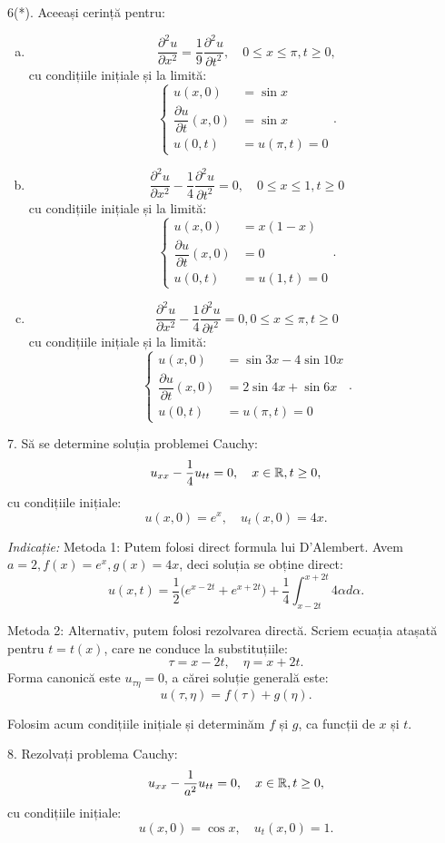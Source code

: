 6(*). Aceeași cerință pentru:
\begin{enumerate}[(a)]
\item
  \[
    \dfrac{\partial^2 u}{\partial x^2} = \dfrac{1}{9}\dfrac{\partial^2 u}{\partial t^2}, %
    \quad 0 \leq x \leq \pi, t \geq 0,
  \]
  cu condițiile inițiale și la limită:
  \[
    \begin{cases}
      u(x, 0) &= \sin x \\
      \dfrac{\partial u}{\partial t}(x, 0) &= \sin x \\
      u(0, t) &= u(\pi, t) = 0
    \end{cases}.
  \]
\item
  \[
    \dfrac{\partial^2 u}{\partial x^2} - \dfrac{1}{4} \dfrac{\partial^2 u}{\partial t^2} = 0, %
    \quad 0 \leq x \leq 1, t \geq 0
  \]
  cu condițiile inițiale și la limită:
  \[
    \begin{cases}
      u(x, 0) &= x(1 - x) \\
      \dfrac{\partial u}{\partial t}(x, 0) &= 0 \\
      u(0, t) &= u(1, t) = 0
    \end{cases}.
  \]
\item
  \[
    \dfrac{\partial^2 u}{\partial x^2} - \dfrac{1}{4} \dfrac{\partial^2 u}{\partial t^2} = 0, %
    0 \leq x \leq \pi, t \geq 0
  \]
  cu condițiile inițiale și la limită:
  \[
    \begin{cases}
      u(x, 0) &= \sin 3x - 4\sin 10x \\
      \dfrac{\partial u}{\partial t}(x, 0) &= 2 \sin 4x + \sin 6x \\
      u(0, t) &= u(\pi, t) = 0
    \end{cases}.
  \]
\end{enumerate}

\vspace{1cm}

7. Să se determine soluția problemei Cauchy:
\[
  u_{xx} - \dfrac{1}{4} u_{tt} = 0, \quad x \in \mathbb{R}, t \geq 0,
\]
cu condițiile inițiale:
\[
  u(x, 0) = e^x, \quad u_t(x, 0) = 4x.
\]

\emph{Indicație:} Metoda 1: Putem folosi direct formula lui D'Alembert. Avem
$ a = 2, f(x) = e^x, g(x) = 4x $, deci soluția se obține direct:
\[
  u(x, t) = \dfrac{1}{2} \Big( e^{x - 2t} + e^{x + 2t} \Big) + %
  \dfrac{1}{4} \int_{x - 2t}^{x + 2t} 4 \alpha d\alpha.
\]

Metoda 2: Alternativ, putem folosi rezolvarea directă. Scriem ecuația
atașată pentru $ t = t(x) $, care ne conduce la substituțiile:
\[
  \tau = x - 2t, \quad \eta = x + 2t.
\]
Forma canonică este $ u_{\tau\eta} = 0 $, a cărei soluție generală
este:
\[
  u(\tau, \eta) = f(\tau) + g(\eta).
\]

Folosim acum condițiile inițiale și determinăm $ f $ și $ g $, ca funcții
de $ x $ și $ t $.

\vspace{1cm}

8. Rezolvați problema Cauchy:
\[
  u_{xx} - \dfrac{1}{a^2} u_{tt} = 0, \quad x \in \mathbb{R}, t \geq 0,
\]
cu condițiile inițiale:
\[
  u(x, 0) = \cos x, \quad u_t(x, 0) = 1.
\]


